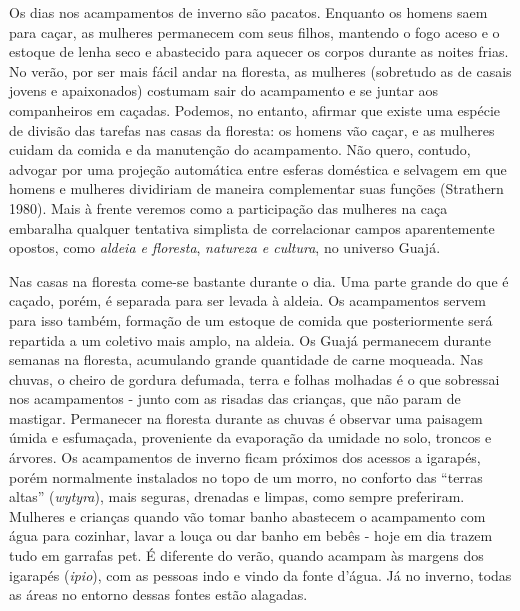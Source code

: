 Os dias nos acampamentos de inverno são pacatos. Enquanto os homens saem
para caçar, as mulheres permanecem com seus filhos, mantendo o fogo
aceso e o estoque de lenha seco e abastecido para aquecer os corpos
durante as noites frias. No verão, por ser mais fácil andar na floresta,
as mulheres (sobretudo as de casais jovens e apaixonados) costumam sair
do acampamento e se juntar aos companheiros em caçadas. Podemos, no
entanto, afirmar que existe uma espécie de divisão das tarefas nas casas
da floresta: os homens vão caçar, e as mulheres cuidam da comida e da
manutenção do acampamento. Não quero, contudo, advogar por uma projeção
automática entre esferas doméstica e selvagem em que homens e mulheres
dividiriam de maneira complementar suas funções (Strathern 1980). Mais à
frente veremos como a participação das mulheres na caça embaralha
qualquer tentativa simplista de correlacionar campos aparentemente
opostos, como \emph{aldeia e floresta}, \emph{natureza e cultura}, no
universo Guajá.

Nas casas na floresta come-se bastante durante o dia. Uma parte grande
do que é caçado, porém, é separada para ser levada à aldeia. Os
acampamentos servem para isso também, formação de um estoque de comida
que posteriormente será repartida a um coletivo mais amplo, na aldeia.
Os Guajá permanecem durante semanas na floresta, acumulando grande
quantidade de carne moqueada. Nas chuvas, o cheiro de gordura defumada,
terra e folhas molhadas é o que sobressai nos acampamentos - junto com
as risadas das crianças, que não param de mastigar. Permanecer na
floresta durante as chuvas é observar uma paisagem úmida e esfumaçada,
proveniente da evaporação da umidade no solo, troncos e árvores. Os
acampamentos de inverno ficam próximos dos acessos a igarapés, porém
normalmente instalados no topo de um morro, no conforto das ``terras
altas'' (\emph{wytyra}), mais seguras, drenadas e limpas, como sempre
preferiram. Mulheres e crianças quando vão tomar banho abastecem o
acampamento com água para cozinhar, lavar a louça ou dar banho em bebês
- hoje em dia trazem tudo em garrafas pet. É diferente do verão, quando
acampam às margens dos igarapés (\emph{ipio}), com as pessoas indo e
vindo da fonte d'água. Já no inverno, todas as áreas no entorno dessas
fontes estão alagadas.

